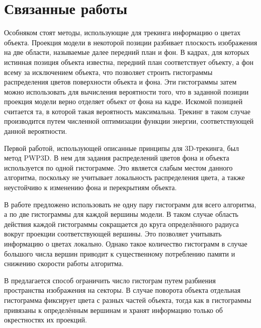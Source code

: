 \section{Связанные работы}


Особняком стоят методы, использующие для трекинга информацию о цветах объекта.
Проекция модели в некоторой позиции разбивает плоскость изображения на две
области, называемые далее передний план и фон.
В кадрах, для которых истинная позиция объекта известна, передний план
соответствует объекту, а фон всему за исключением объекта, что позволяет
строить гистограммы распределения цветов поверхности объекта и фона.
Эти гистограммы затем можно использовать для вычисления вероятности того, что в
заданной позиции проекция модели верно отделяет объект от фона на кадре.
Искомой позицией считается та, в которой такая вероятность максимальна.
Трекинг в таком случае производится путем численной оптимизации функции
энергии, соответствующей данной вероятности.

Первой работой, использующей описанные принципы для 3D-трекинга,
был метод PWP3D\cite{PWP3D}.
В нем для задания распределений цветов фона и объекта используется по одной
гистограмме.
Это является слабым местом данного алгоритма, поскольку не учитывает
локальность распределения цвета, а также неустойчиво к изменению фона
и перекрытиям объекта.

В работе \cite{Tjaden2017} предложено использовать не одну пару гистограмм для
всего алгоритма, а по две гистограммы для каждой вершины модели.
В таком случае область действия каждой гистограммы сокращается до круга
определённого радиуса вокруг проекции соответствующей вершины.
Это позволяет учитывать информацию о цветах локально.
Однако такое количество гистограмм в случае большого числа вершин приводит к
существенному потреблению памяти и снижению скорости работы алгоритма.

В \cite{RegionPhotometric} предлагается способ ограничить число гистограм
путем разбиения пространства изображения на секторы.
В случае поворота объекта отдельная гистограмма фиксирует цвета с разных частей
объекта, тогда как в \cite{Tjaden2017} гистограммы привязаны к определённым
вершинам и хранят информацию только об окрестностях их проекций.

